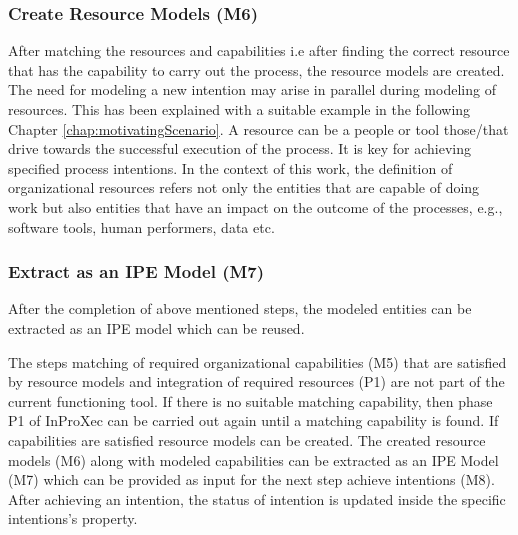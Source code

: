 \subsubsection{Create Resource Models (M6)}  
After matching the resources and capabilities i.e after finding the correct resource that has the capability to carry out the process, the resource models are created. The need for modeling a new intention may arise in parallel during modeling of resources. This has been explained with a suitable example in the following Chapter \ref{chap:motivatingScenario}.  A resource can be a people or tool those/that drive towards the successful execution of the process. It is key for achieving specified process intentions. In the context of this work, the definition of organizational resources refers not only the entities that are capable of doing work but also entities that have an impact on the outcome of the processes, e.g., software tools, human performers, data etc.      

\subsubsection{Extract as an IPE Model (M7)}  
After the completion of above mentioned steps, the modeled entities can be extracted as an IPE model which can be reused. 

The steps matching of required organizational capabilities (M5) that are satisfied by resource models and integration of required resources (P1) are not part of the current functioning tool. If there is no suitable matching capability, then phase P1 of InProXec can be carried out again until a matching capability is found. If capabilities are satisfied resource models can be created. The created resource models (M6) along with modeled capabilities can be extracted as an IPE Model (M7) which can be provided as input for the next step achieve intentions (M8). After achieving an intention, the status of intention is updated inside the specific intentions's property. 

